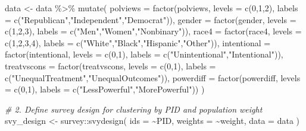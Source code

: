 \documentclass[
  13pt,
  a4paper,
]{article}
\newenvironment{Shaded}{\begin{snugshade}}{\end{snugshade}}
\newcommand{\AttributeTok}[1]{\textcolor[rgb]{0.77,0.63,0.00}{#1}}
\newcommand{\CommentTok}[1]{\textcolor[rgb]{0.56,0.35,0.01}{\textit{#1}}}
\newcommand{\DecValTok}[1]{\textcolor[rgb]{0.00,0.00,0.81}{#1}}
\newcommand{\FunctionTok}[1]{\textcolor[rgb]{0.00,0.00,0.00}{#1}}
\newcommand{\NormalTok}[1]{#1}
\newcommand{\OtherTok}[1]{\textcolor[rgb]{0.56,0.35,0.01}{#1}}
\newcommand{\SpecialCharTok}[1]{\textcolor[rgb]{0.00,0.00,0.00}{#1}}
\newcommand{\StringTok}[1]{\textcolor[rgb]{0.31,0.60,0.02}{#1}}
\begin{document}
\begin{Shaded}
\begin{Highlighting}[]
\NormalTok{data }\OtherTok{\textless{}{-}}\NormalTok{ data }\SpecialCharTok{\%\textgreater{}\%}
  \FunctionTok{mutate}\NormalTok{(}
    \AttributeTok{polviews    =} \FunctionTok{factor}\NormalTok{(polviews,    }\AttributeTok{levels =} \FunctionTok{c}\NormalTok{(}\DecValTok{0}\NormalTok{,}\DecValTok{1}\NormalTok{,}\DecValTok{2}\NormalTok{), }\AttributeTok{labels =} \FunctionTok{c}\NormalTok{(}\StringTok{"Republican"}\NormalTok{,}\StringTok{"Independent"}\NormalTok{,}\StringTok{"Democrat"}\NormalTok{)),}
    \AttributeTok{gender      =} \FunctionTok{factor}\NormalTok{(gender,      }\AttributeTok{levels =} \FunctionTok{c}\NormalTok{(}\DecValTok{1}\NormalTok{,}\DecValTok{2}\NormalTok{,}\DecValTok{3}\NormalTok{), }\AttributeTok{labels =} \FunctionTok{c}\NormalTok{(}\StringTok{"Men"}\NormalTok{,}\StringTok{"Women"}\NormalTok{,}\StringTok{"Nonbinary"}\NormalTok{)),}
    \AttributeTok{race4       =} \FunctionTok{factor}\NormalTok{(race4,       }\AttributeTok{levels =} \FunctionTok{c}\NormalTok{(}\DecValTok{1}\NormalTok{,}\DecValTok{2}\NormalTok{,}\DecValTok{3}\NormalTok{,}\DecValTok{4}\NormalTok{), }\AttributeTok{labels =} \FunctionTok{c}\NormalTok{(}\StringTok{"White"}\NormalTok{,}\StringTok{"Black"}\NormalTok{,}\StringTok{"Hispanic"}\NormalTok{,}\StringTok{"Other"}\NormalTok{)),}
    \AttributeTok{intentional =} \FunctionTok{factor}\NormalTok{(intentional, }\AttributeTok{levels =} \FunctionTok{c}\NormalTok{(}\DecValTok{0}\NormalTok{,}\DecValTok{1}\NormalTok{), }\AttributeTok{labels =} \FunctionTok{c}\NormalTok{(}\StringTok{"Unintentional"}\NormalTok{,}\StringTok{"Intentional"}\NormalTok{)),}
    \AttributeTok{treatvscons =} \FunctionTok{factor}\NormalTok{(treatvscons, }\AttributeTok{levels =} \FunctionTok{c}\NormalTok{(}\DecValTok{0}\NormalTok{,}\DecValTok{1}\NormalTok{), }\AttributeTok{labels =} \FunctionTok{c}\NormalTok{(}\StringTok{"UnequalTreatment"}\NormalTok{,}\StringTok{"UnequalOutcomes"}\NormalTok{)),}
    \AttributeTok{powerdiff   =} \FunctionTok{factor}\NormalTok{(powerdiff,   }\AttributeTok{levels =} \FunctionTok{c}\NormalTok{(}\DecValTok{0}\NormalTok{,}\DecValTok{1}\NormalTok{), }\AttributeTok{labels =} \FunctionTok{c}\NormalTok{(}\StringTok{"LessPowerful"}\NormalTok{,}\StringTok{"MorePowerful"}\NormalTok{))}
\NormalTok{  )}

\CommentTok{\# 2. Define survey design for clustering by PID and population weight}
\NormalTok{svy\_design }\OtherTok{\textless{}{-}}\NormalTok{ survey}\SpecialCharTok{::}\FunctionTok{svydesign}\NormalTok{(}
  \AttributeTok{ids     =} \SpecialCharTok{\textasciitilde{}}\NormalTok{PID,}
  \AttributeTok{weights =} \SpecialCharTok{\textasciitilde{}}\NormalTok{weight,}
  \AttributeTok{data    =}\NormalTok{ data}
\NormalTok{)}


\end{Highlighting}
\end{Shaded}
\end{document}
